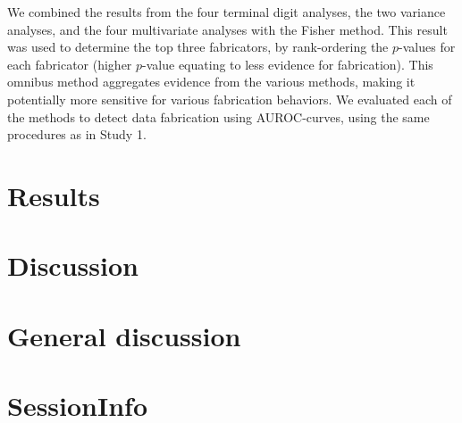 \documentclass{article}
\begin{document}
We combined the results from the four terminal digit analyses, the two variance analyses, and the four multivariate analyses with the Fisher method. This result was used to determine the top three fabricators, by rank-ordering the $p$-values for each fabricator (higher $p$-value equating to less evidence for fabrication). This omnibus method aggregates evidence from the various methods, making it potentially more sensitive for various fabrication behaviors. We evaluated each of the methods to detect data fabrication using AUROC-curves, using the same procedures as in Study 1.

\section*{Results}



\section*{Discussion}


\section*{General discussion}



\newpage
\section*{SessionInfo}
\end{document}

